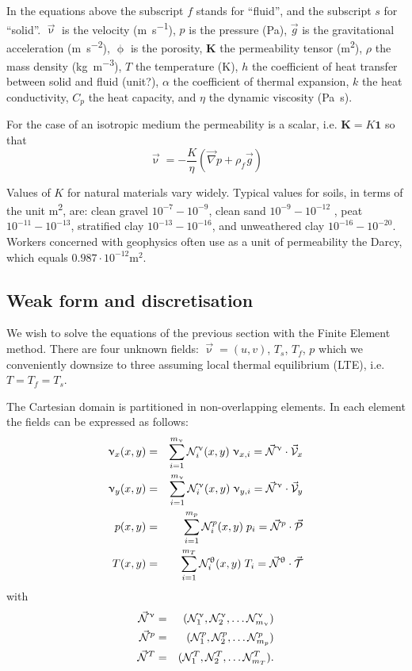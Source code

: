 \noindent In the equations above the subscript $f$ stands for ``fluid'', and the subscript $s$ for ``solid''. $\vec{\upnu}$ is the velocity (\si{\metre\per\second}), $p$ is the pressure (\si{\pascal}), $\vec{g}$ is the gravitational acceleration (\si{\metre\per\square\second}), $\upphi$ is the porosity, ${\bm K}$ the permeability tensor (\si{\square\metre}), $\rho$ the mass density (\si{\kg\per\cubic\metre}), $T$ the temperature (\si{\kelvin}), $h$ the coefficient of heat transfer between solid and fluid (unit?), $\alpha$ the coefficient of thermal expansion, $k$ the heat conductivity, $C_p$ the heat capacity, and $\eta$ the dynamic viscosity (\si{\pascal\second}). 

For the case of an isotropic medium the permeability is a scalar, i.e. ${\bm K}=K {\bm 1}$ so that 
\begin{equation}
\vec{\upnu} = -\frac{K}{\eta} (\vec\nabla p + \rho_f \vec{g})
\label{eq:darcy2}
\end{equation}

Values of $K$ for natural materials vary widely. Typical values for soils, in terms of the unit \si{\square\metre}, 
are: clean gravel $10^{-7}-10^{-9}$, 
clean sand $10^{-9}-10^{-12}$ , peat $10^{-11}-10^{-13}$,
stratified clay $10^{-13}-10^{-16}$, 
and unweathered clay $10^{-16}-10^{-20}$. 
Workers concerned with geophysics often use as a unit of permeability the Darcy, which equals $0.987\cdot 10^{-12}\si{\square\metre}$.



\subsection{Weak form and discretisation}

We wish to solve the equations of the previous section 
with the Finite Element method. 
There are four unknown fields: $\vec{\upnu}=(u,v)$, $T_s$, $T_f$, $p$
which we conveniently downsize to three assuming local thermal equilibrium (LTE), i.e. $T=T_f=T_s$.

The Cartesian domain is partitioned in non-overlapping elements. 
In each element the fields can be expressed as follows:
\begin{eqnarray}
\upnu_x(x,y) &=& \sum_{i=1}^{m_\upnu} {\mathcal{N}}_i^\upnu (x,y) \; \upnu_{x,i} = \vec{{\mathcal{N}}}^\upnu \cdot \vec{\cal V}_x \\
\upnu_y(x,y) &=& \sum_{i=1}^{m_\upnu} {\mathcal{N}}_i^\upnu (x,y) \; \upnu_{y,i} = \vec{{\mathcal{N}}}^\upnu \cdot \vec{\cal V}_y \\
p(x,y) &=& \sum_{i=1}^{m_p} {\mathcal{N}}_i^p(x,y) \; p_i 
= \vec{{\mathcal{N}}}^p \cdot \vec{\cal P} \\
T(x,y) &=& \sum_{i=1}^{m_T} {\mathcal{N}}_i^\uptheta (x,y) \; T_i
= \vec{{\mathcal{N}}}^\uptheta \cdot \vec{\cal T}
\end{eqnarray}
with
\begin{eqnarray}
\vec{{\mathcal{N}}}^\upnu &=& ({\mathcal{N}}^\upnu_1, {\mathcal{N}}^\upnu_2, \dots {\mathcal{N}}^\upnu_{m_\upnu}) \\
\vec{{\mathcal{N}}}^p &=& ({\mathcal{N}}^p_1, {\mathcal{N}}^p_2, \dots {\mathcal{N}}^p_{m_p}) \\
\vec{{\mathcal{N}}}^T &=& ({\mathcal{N}}^T_1, {\mathcal{N}}^T_2, \dots {\mathcal{N}}^T_{m_T}).
\end{eqnarray}

